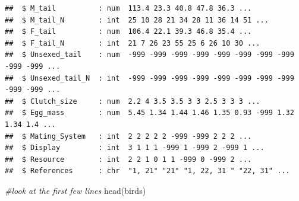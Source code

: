 \documentclass[
  12pt,
]{article}
\newenvironment{Shaded}{\begin{snugshade}}{\end{snugshade}}
\newcommand{\CommentTok}[1]{\textcolor[rgb]{0.56,0.35,0.01}{\textit{#1}}}
\newcommand{\FunctionTok}[1]{\textcolor[rgb]{0.00,0.00,0.00}{#1}}
\newcommand{\NormalTok}[1]{#1}
\begin{document}
\begin{verbatim}
##  $ M_tail          : num  113.4 23.3 40.8 47.8 36.3 ...
##  $ M_tail_N        : int  25 10 28 21 34 28 11 36 14 51 ...
##  $ F_tail          : num  106.4 22.1 39.3 46.8 35.4 ...
##  $ F_tail_N        : int  21 7 26 23 55 25 6 26 10 30 ...
##  $ Unsexed_tail    : num  -999 -999 -999 -999 -999 -999 -999 -999 -999 -999 ...
##  $ Unsexed_tail_N  : int  -999 -999 -999 -999 -999 -999 -999 -999 -999 -999 ...
##  $ Clutch_size     : num  2.2 4 3.5 3.5 3 3 2.5 3 3 3 ...
##  $ Egg_mass        : num  5.45 1.34 1.44 1.46 1.35 0.93 -999 1.32 1.34 1.4 ...
##  $ Mating_System   : int  2 2 2 2 2 -999 -999 2 2 2 ...
##  $ Display         : int  3 1 1 1 -999 1 -999 2 -999 1 ...
##  $ Resource        : int  2 2 1 0 1 1 -999 0 -999 2 ...
##  $ References      : chr  "1, 21" "21" "1, 22, 31 " "22, 31" ...
\end{verbatim}

\begin{Shaded}
\begin{Highlighting}[]
\CommentTok{\#look at the first few lines}
\FunctionTok{head}\NormalTok{(birds)}
\end{Highlighting}
\end{Shaded}
\end{document}

